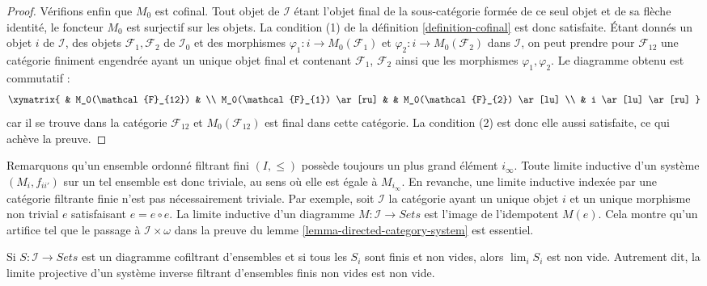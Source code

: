 \begin{proof}
\medskip\noindent
Vérifions enfin que $M_0$ est cofinal. Tout objet de $\mathcal{I}$ étant
l'objet final de la sous-catégorie formée de ce seul objet et de sa flèche
identité, le foncteur $M_0$ est surjectif sur les objets. La condition (1) de
la définition \ref{definition-cofinal} est donc satisfaite. Étant donnés un
objet $i$ de $\mathcal{I}$, des objets $\mathcal{F}_1, \mathcal{F}_2$ de
$\mathcal{I}_0$ et des morphismes
$\varphi_1 : i \to M_0(\mathcal{F}_1)$ et
$\varphi_2 : i \to M_0(\mathcal{F}_2)$ dans $\mathcal{I}$, on peut prendre
pour $\mathcal{F}_{12}$ une catégorie finiment engendrée ayant un unique
objet final et contenant $\mathcal{F}_1$, $\mathcal{F}_2$ ainsi que les
morphismes $\varphi_1, \varphi_2$. Le diagramme obtenu est commutatif :
$$
\xymatrix{
& M_0(\mathcal{F}_{12}) & \\
M_0(\mathcal{F}_{1}) \ar[ru] & & M_0(\mathcal{F}_{2}) \ar[lu] \\
& i \ar[lu] \ar[ru]
}
$$
car il se trouve dans la catégorie $\mathcal{F}_{12}$ et
$M_0(\mathcal{F}_{12})$ est final dans cette catégorie. La condition (2) est
donc elle aussi satisfaite, ce qui achève la preuve.
\end{proof}

\begin{remark}
\label{remark-trick-needed}
Remarquons qu'un ensemble ordonné filtrant fini $(I, \leq)$ possède toujours
un plus grand élément $i_\infty$. Toute limite inductive d'un système
$(M_i, f_{ii'})$ sur un tel ensemble est donc triviale, au sens où elle est
égale à $M_{i_\infty}$. En revanche, une limite inductive indexée par une
catégorie filtrante finie n'est pas nécessairement triviale. Par exemple,
soit $\mathcal{I}$ la catégorie ayant un unique objet $i$ et un unique
morphisme non trivial $e$ satisfaisant $e = e \circ e$. La limite inductive
d'un diagramme $M : \mathcal{I} \to Sets$ est l'image de l'idempotent $M(e)$.
Cela montre qu'un artifice tel que le passage à
$\mathcal{I}\times \omega$ dans la preuve du
lemme \ref{lemma-directed-category-system} est essentiel.
\end{remark}

\begin{lemma}
\label{lemma-nonempty-limit}
Si $S : \mathcal{I} \to \textit{Sets}$ est un diagramme cofiltrant
d'ensembles et si tous les $S_i$ sont finis et non vides, alors
$\lim_i S_i$ est non vide. Autrement dit, la limite projective d'un système
inverse filtrant d'ensembles finis non vides est non vide.
\end{lemma}

